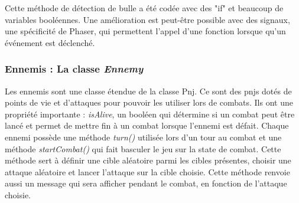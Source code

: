 \documentclass[11pt]{article}
\begin{document}
Cette méthode de détection de bulle a été codée avec des "if" et beaucoup de variables booléennes. Une amélioration est peut-être possible avec des signaux, une spécificité de Phaser, qui permettent l'appel d'une fonction lorsque qu'un événement est déclenché.\subsubsection{Ennemis : La classe \textit{Ennemy}}
Les ennemis sont une classe étendue de la classe Pnj. Ce sont des pnjs dotés de points de vie et d'attaques pour pouvoir les utiliser lors de combats. Ils ont une propriété importante : \textit{isAlive}, un booléen qui détermine si un combat peut être lancé et permet de mettre fin à un combat lorsque l'ennemi est défait. Chaque ennemi possède une méthode \textit{turn()} utilisée lors d'un tour au combat et une méthode \textit{startCombat()} qui fait basculer le jeu sur la state de combat. Cette méthode sert à définir une cible aléatoire parmi les cibles présentes, choisir une attaque aléatoire et lancer l'attaque sur la cible choisie. Cette méthode renvoie aussi un message qui sera afficher pendant le combat, en fonction de l'attaque choisie.
\end{document}
